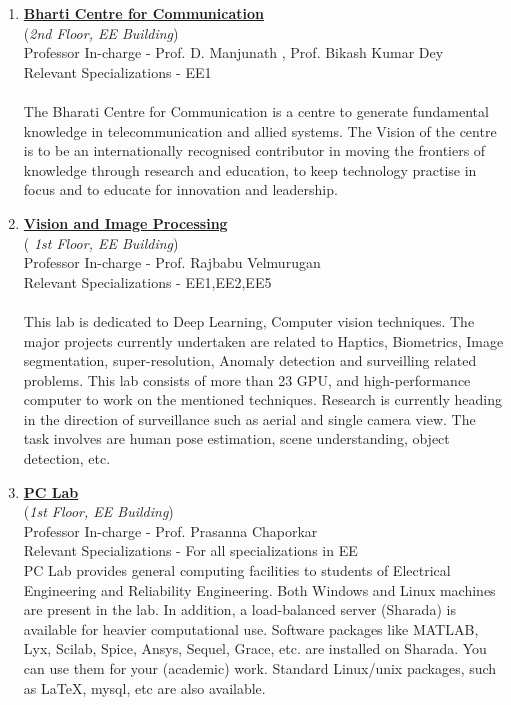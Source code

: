 \documentclass[openany]{book} %
\begin{document}
\begin{enumerate}
\item \href{https://www.ee.iitb.ac.in/bharticentre/index.html} {\color{blue} \textbf{Bharti Centre for Communication}}\\
    (\textit{2nd Floor, EE Building})\\
    Professor In-charge - Prof. D. Manjunath , Prof. Bikash Kumar Dey\\
Relevant Specializations - EE1\\
\\
The Bharati Centre for Communication is a centre to generate fundamental knowledge in telecommunication and allied systems. The Vision of the centre is to  be an internationally recognised contributor in moving the frontiers of knowledge through research and education, to keep technology practise in focus and to educate for innovation and leadership.\\

\item \href{http://www.ee.iitb.ac.in/~viplab/} {\color{blue} \textbf{Vision and Image Processing}}\\
    (\textit{ 1st Floor, EE Building})\\
    Professor In-charge - Prof. Rajbabu Velmurugan \\
Relevant Specializations - EE1,EE2,EE5\\
\\
This lab is dedicated to Deep Learning, Computer vision techniques. The major projects currently undertaken are related to Haptics, Biometrics, Image segmentation, super-resolution, Anomaly detection and surveilling related problems. This lab consists of more than 23 GPU, and high-performance computer to work on the mentioned techniques. Research is currently heading in the direction of surveillance such as aerial and single camera view. The task involves are human pose estimation, scene understanding, object detection, etc.\\

\item  \href{http://www.ee.iitb.ac.in/~pclab/index.php/}{\color{blue}\textbf{PC Lab}}\\
    (\textit{1st Floor, EE Building})\\
    Professor In-charge - Prof. Prasanna Chaporkar\\
Relevant Specializations - For all specializations in EE\\
PC Lab provides general computing facilities to students of Electrical Engineering and Reliability Engineering. Both Windows and Linux machines are present in the lab. In addition, a load-balanced server (Sharada) is available for heavier computational use. Software packages like MATLAB, Lyx, Scilab, Spice, Ansys, Sequel, Grace, etc. are installed on Sharada. You can use them for your (academic) work. Standard Linux/unix packages, such as LaTeX, mysql, etc are also available. 
\\



\end{enumerate}
\end{document}
